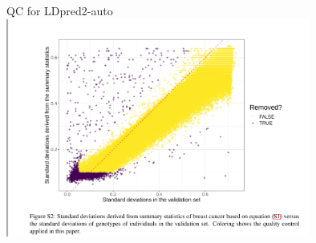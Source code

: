 \documentclass{beamer}
\begin{document}
%                
    
    
    \appendix
    \begin{frame}{QC for LDpred2-auto}
    \includegraphics[width=100mm,scale=1]{S1.png}
        
    \end{frame}
%        
%        
    

       
\end{document}
